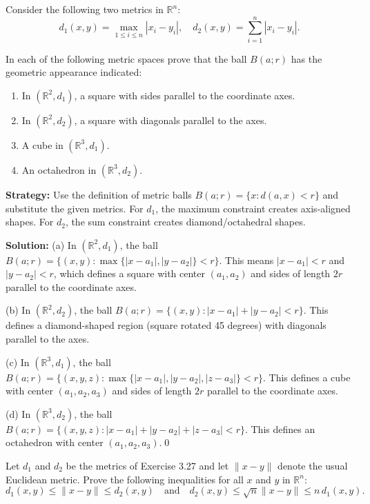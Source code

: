 \begin{problembox}
Consider the following two metrics in \( \mathbb{R}^n \):
\[d_1(x, y) = \max_{1 \leq i \leq n} |x_i - y_i|, \quad d_2(x, y) = \sum_{i=1}^n |x_i - y_i|.\]

In each of the following metric spaces prove that the ball \( B(a; r) \) has the geometric appearance indicated:
\begin{enumerate}[label=\alph*)]
\item In \( (\mathbb{R}^2, d_1) \), a square with sides parallel to the coordinate axes.
\item In \( (\mathbb{R}^2, d_2) \), a square with diagonals parallel to the axes.
\item A cube in \( (\mathbb{R}^3, d_1) \).
\item An octahedron in \( (\mathbb{R}^3, d_2) \).
\end{enumerate}
\end{problembox}

\noindent\textbf{Strategy:} Use the definition of metric balls $B(a;r) = \{x : d(a,x) < r\}$ and substitute the given metrics. For $d_1$, the maximum constraint creates axis-aligned shapes. For $d_2$, the sum constraint creates diamond/octahedral shapes.

\bigskip\noindent\textbf{Solution:} 
(a) In $(\mathbb{R}^2, d_1)$, the ball $B(a;r) = \{(x,y) : \max\{|x-a_1|, |y-a_2|\} < r\}$. This means $|x-a_1| < r$ and $|y-a_2| < r$, which defines a square with center $(a_1,a_2)$ and sides of length $2r$ parallel to the coordinate axes.

(b) In $(\mathbb{R}^2, d_2)$, the ball $B(a;r) = \{(x,y) : |x-a_1| + |y-a_2| < r\}$. This defines a diamond-shaped region (square rotated 45 degrees) with diagonals parallel to the axes.

(c) In $(\mathbb{R}^3, d_1)$, the ball $B(a;r) = \{(x,y,z) : \max\{|x-a_1|, |y-a_2|, |z-a_3|\} < r\}$. This defines a cube with center $(a_1,a_2,a_3)$ and sides of length $2r$ parallel to the coordinate axes.

(d) In $(\mathbb{R}^3, d_2)$, the ball $B(a;r) = \{(x,y,z) : |x-a_1| + |y-a_2| + |z-a_3| < r\}$. This defines an octahedron with center $(a_1,a_2,a_3)$.\qed


\begin{problembox}
Let \( d_1 \) and \( d_2 \) be the metrics of Exercise 3.27 and let \( \|x - y\| \) denote the usual Euclidean metric. Prove the following inequalities for all \( x \) and \( y \) in \( \mathbb{R}^n \):
\[d_1(x, y) \leq \|x - y\| \leq d_2(x, y) \quad \text{and} \quad d_2(x, y) \leq \sqrt{n} \|x - y\| \leq n\,d_1(x, y).\]
\end{problembox}

